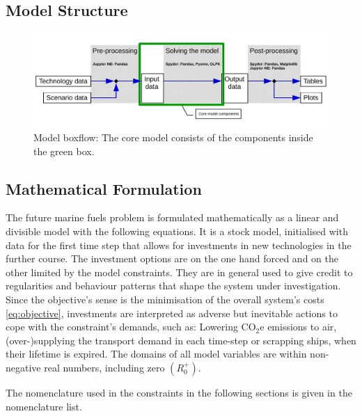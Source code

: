 \documentclass[article]{elsarticle}
\begin{document}
\subsection{Model Structure}
\begin{figure}[htb]
    \centering
    \includegraphics[width=\textwidth]{figures/model_boxflow_paper.pdf}
    \caption{Model boxflow: The core model consists of the components inside the green box.}
    \label{fig:model_boxflow}
\end{figure}

\subsection{Mathematical Formulation}
\label{subsec:Mat}
The future marine fuels problem is formulated mathematically as a linear and divisible model with the following equations. It is a stock model, initialised with data for the first time step that allows for investments in new technologies in the further course. The investment options are on the one hand forced and on the other limited by the model constraints. They are in general used to give credit to regularities and behaviour patterns that shape the system under investigation. Since the objective's sense is the minimisation of the overall system's costs \cref{eq:objective}, investments are interpreted as adverse but inevitable actions to cope with the constraint's demands, such as: Lowering CO$_2$e emissions to air, (over-)supplying the transport demand in each time-step or scrapping ships, when their lifetime is expired. The domains of all model variables are within non-negative real numbers, including zero $\left(R_{0}^{+}\right)$.

The nomenclature used in the constraints in the following sections is given in the nomenclature list.
\glsdisablehyper
\glsaddall
\begin{table}[htb] 
\renewcommand\tablename{Nomenclature list}
\begin{mdframed}
\footnotesize{
\begin{multicols}{2}
\printglossary[style=tree,type=a]
\vspace{-0.3cm}
\printglossary[style=tree,type=s]
\vspace{-0.3cm}
\printglossary[style=tree,type=v]
\vspace{-0.3cm}
\printglossary[style=tree,type=p]
\end{multicols}
}
\end{mdframed}
\caption{}
\end{table}
\end{document}
